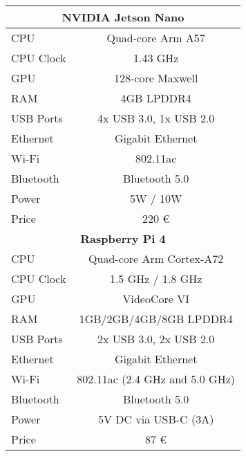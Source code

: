 \begin{longtable}{|l|c|}
	\multicolumn{2}{|c|}{\textbf{NVIDIA Jetson Nano}}                         \\
	\hline
	CPU       & Quad-core Arm A57                                             \\
	CPU Clock & 1.43 GHz                                                      \\
	GPU       & 128-core Maxwell                                              \\
	RAM       & 4GB LPDDR4                                                    \\
	USB Ports & 4x USB 3.0, 1x USB 2.0                                        \\
	Ethernet  & Gigabit Ethernet                                              \\
	Wi-Fi     & 802.11ac                                                      \\
	Bluetooth & Bluetooth 5.0                                                 \\
	Power     & 5W / 10W                                                      \\
	Price     & 220 \euro                                                     \\
	\hline

	\multicolumn{2}{|c|}{\textbf{Raspberry Pi 4}}                             \\
	\hline
	CPU       & Quad-core Arm Cortex-A72                                      \\
	CPU Clock & 1.5 GHz / 1.8 GHz                                             \\
	GPU       & VideoCore VI                                                  \\
	RAM       & 1GB/2GB/4GB/8GB LPDDR4                                        \\
	USB Ports & 2x USB 3.0, 2x USB 2.0                                        \\
	Ethernet  & Gigabit Ethernet                                              \\
	Wi-Fi     & 802.11ac (2.4 GHz and 5.0 GHz)                                \\
	Bluetooth & Bluetooth 5.0                                                 \\
	Power     & 5V DC via USB-C (3A)                                          \\
	Price     & 87 \euro                                                      \\
	\hline


\end{longtable}
